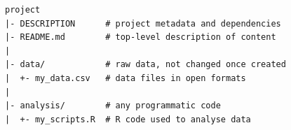 \documentclass[14pt]{beamer}
\begin{document}
\begin{frame}[fragile, label=package]

\footnotesize

\begin{verbatim}
project
|- DESCRIPTION      # project metadata and dependencies 
|- README.md        # top-level description of content
|
|- data/            # raw data, not changed once created
|  +- my_data.csv   # data files in open formats
|
|- analysis/        # any programmatic code 
|  +- my_scripts.R  # R code used to analyse data 
\end{verbatim}

\end{frame}


\end{document}
